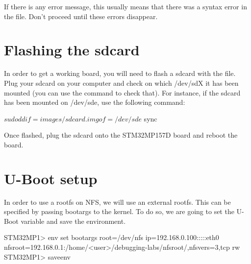 If there is any error message, this usually means that there was a
syntax error in the  file. Don't proceed until these
errors disappear.

\section{Flashing the sdcard}

In order to get a working board, you will need to flash a sdcard with the 
 file. Plug your sdcard on your computer and check
on which /dev/sdX it has been mounted (you can use the  command to
check that). For instance, if the sdcard has been mounted on /dev/sde, use the
following command:

\begin{bashinput}
$ sudo dd if=images/sdcard.img of=/dev/sde
$ sync
\end{bashinput}

Once flashed, plug the sdcard onto the STM32MP157D board and reboot the board.

\section{U-Boot setup}

In order to use a rootfs on NFS, we will use an external rootfs. This can be
specified by passing bootargs to the kernel. To do so, we are going to set the
 U-Boot variable and save the environment.

\begin{bashinput}
STM32MP1> env set bootargs root=/dev/nfs ip=192.168.0.100:::::eth0
  nfsroot=192.168.0.1:/home/<user>/debugging-labs/nfsroot/,nfsvers=3,tcp rw
STM32MP1> saveenv
\end{bashinput}

